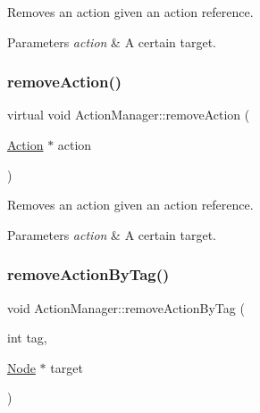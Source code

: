 Removes an action given an action reference.


\begin{DoxyParams}{Parameters}
{\em action} & A certain target. \\
\hline
\end{DoxyParams}
\mbox{\label{classActionManager_ab564bd417def5a377a2010ae076dcc6d}} 
\subsubsection{\texorpdfstring{remove\+Action()}{removeAction()}\hspace{0.1cm}{\footnotesize\ttfamily [2/2]}}
{\footnotesize\ttfamily virtual void Action\+Manager\+::remove\+Action (\begin{DoxyParamCaption}\item[{\hyperlink{classAction}{Action} $\ast$}]{action }\end{DoxyParamCaption})\hspace{0.3cm}{\ttfamily [virtual]}}

Removes an action given an action reference.


\begin{DoxyParams}{Parameters}
{\em action} & A certain target. \\
\hline
\end{DoxyParams}
\mbox{\label{classActionManager_aceaf0328518eb5f8d1cf6cea71594ee4}} 
\subsubsection{\texorpdfstring{remove\+Action\+By\+Tag()}{removeActionByTag()}\hspace{0.1cm}{\footnotesize\ttfamily [1/2]}}
{\footnotesize\ttfamily void Action\+Manager\+::remove\+Action\+By\+Tag (\begin{DoxyParamCaption}\item[{int}]{tag,  }\item[{\hyperlink{classNode}{Node} $\ast$}]{target }\end{DoxyParamCaption})}

